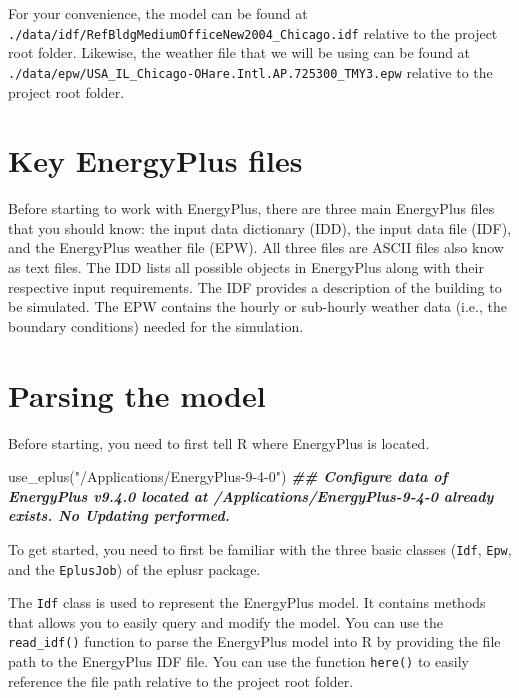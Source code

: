 \documentclass[
]{book}
\newenvironment{Shaded}{\begin{snugshade}}{\end{snugshade}}
\newcommand{\DocumentationTok}[1]{\textcolor[rgb]{0.56,0.35,0.01}{\textbf{\textit{#1}}}}
\newcommand{\FunctionTok}[1]{\textcolor[rgb]{0.00,0.00,0.00}{#1}}
\newcommand{\NormalTok}[1]{#1}
\newcommand{\StringTok}[1]{\textcolor[rgb]{0.31,0.60,0.02}{#1}}
\begin{document}
For your convenience, the model can be found at \texttt{./data/idf/RefBldgMediumOfficeNew2004\_Chicago.idf} relative to the project root folder. Likewise, the weather file that we will be using can be found at \texttt{./data/epw/USA\_IL\_Chicago-OHare.Intl.AP.725300\_TMY3.epw} relative to the project root folder.

\hypertarget{key-energyplus-files}{%
\section{Key EnergyPlus files}\label{key-energyplus-files}}

Before starting to work with EnergyPlus, there are three main EnergyPlus files that you should know: the input data dictionary (IDD), the input data file (IDF), and the EnergyPlus weather file (EPW). All three files are ASCII files also know as text files. The IDD lists all possible objects in EnergyPlus along with their respective input requirements. The IDF provides a description of the building to be simulated. The EPW contains the hourly or sub-hourly weather data (i.e., the boundary conditions) needed for the simulation.

\hypertarget{parsing-the-model}{%
\section{Parsing the model}\label{parsing-the-model}}

Before starting, you need to first tell R where EnergyPlus is located.

\begin{Shaded}
\begin{Highlighting}[]
\FunctionTok{use\_eplus}\NormalTok{(}\StringTok{"/Applications/EnergyPlus{-}9{-}4{-}0"}\NormalTok{)}
\DocumentationTok{\#\# Configure data of EnergyPlus v9.4.0 located at \textquotesingle{}/Applications/EnergyPlus{-}9{-}4{-}0\textquotesingle{} already exists. No Updating performed.}
\end{Highlighting}
\end{Shaded}

To get started, you need to first be familiar with the three basic classes (\texttt{Idf}, \texttt{Epw}, and the \texttt{EplusJob}) of the eplusr package.

The \texttt{Idf} class is used to represent the EnergyPlus model. It contains methods that allows you to easily query and modify the model. You can use the \texttt{read\_idf()} function to parse the EnergyPlus model into R by providing the file path to the EnergyPlus IDF file. You can use the function \texttt{here()} to easily reference the file path relative to the project root folder.
\end{document}
